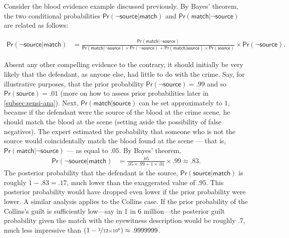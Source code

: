 \documentclass{article}
\newcommand{\pr}{\mathsf{Pr}}
\begin{document}


Consider the blood evidence example discussed previously. By Bayes' theorem, the two conditional probabilities $\pr(\neg \textsf{source} \vert \textsf{match})$ and $\pr(\textsf{match} \vert \neg \textsf{source})$ are related as follows:
%
\begin{small}
\begin{align*} \pr(\neg \textsf{source} \vert \textsf{match}) & =  \frac{\pr(\textsf{match} \vert \neg \textsf{source})}{ \pr(\textsf{match} \vert \neg \textsf{source})\times \pr(\neg \textsf{source})+ \pr(\textsf{match} \vert \textsf{source})\times \pr(\textsf{source})} \times \pr(\neg \textsf{source}).\end{align*}
\end{small}
%
Absent any  other compelling evidence to the contrary, it should initially be very likely that the defendant, as anyone else, had little to do with the crime. Say, for illustrative purposes, that the prior probability  $\pr(\neg \textsf{source})= .99$ and  so $\pr(\textsf{source})=.01$ (more on how to assess prior probabilities later in \ref{subsec:sensi-ana}).
Next, $\pr(\textsf{match} \vert \textsf{source})$ can be set approximately  to $1$, because if the defendant were the source of the blood at the crime scene, he should match the blood at the scene (setting aside the possibility of false negatives). The expert estimated  the probability that someone who is not the source would coincidentally match the blood found at the scene --- that is, $\pr(\textsf{match} \vert \neg \textsf{source})$ --- as equal to $.05$. %
By Bayes' theorem,
%
\begin{align*} \pr(\neg \textsf{source} \vert \textsf{match}) & = \frac{.05}{ .05 \times .99+ 1 \times .01} \times .99 \approx .83. \end{align*}
%
\noindent The posterior probability that  the defendant is the source, $\pr(\textsf{source}\vert \textsf{match})$ is  roughly $1-.83=.17$, much lower than the exaggerated value of $.95$. This posterior probability would have dropped even lower if the prior probability were lower. 
%
A similar analysis applies to the  Collins case. If the prior probability of the Collins's guilt is sufficiently low---say in 1 in 6 million---the posterior guilt probability given  the match with the eyewitness description would be roughly .7, much less impressive than $(1-\nicefrac{1}{12\times 10^6})\approx .9999999$. %
\end{document}
